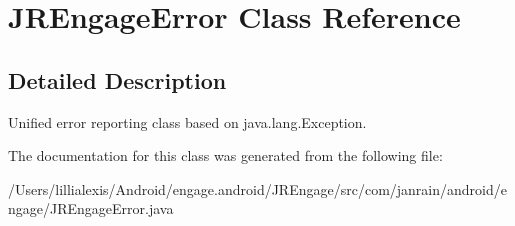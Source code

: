 \hypertarget{classcom_1_1janrain_1_1android_1_1engage_1_1_j_r_engage_error}{
\section{JREngageError Class Reference}
\label{classcom_1_1janrain_1_1android_1_1engage_1_1_j_r_engage_error}
}


\subsection{Detailed Description}
Unified error reporting class based on java.lang.Exception. 

The documentation for this class was generated from the following file:\begin{DoxyCompactItemize}
\item 
/Users/lillialexis/Android/engage.android/JREngage/src/com/janrain/android/engage/JREngageError.java\end{DoxyCompactItemize}
